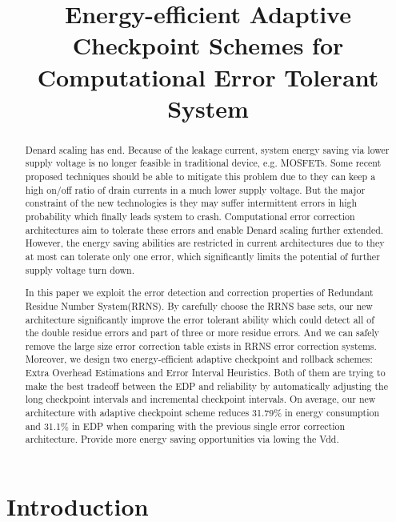 \documentclass{sig-alternate}
\title{Energy-efficient Adaptive Checkpoint Schemes for Computational Error Tolerant System}
\begin{document}
\sloppy
\maketitle
\thispagestyle{firstpage}
\pagestyle{plain}




\begin{abstract}

Denard scaling has end. Because of the leakage current, system energy saving via lower supply voltage is no longer feasible in traditional device, e.g. MOSFETs. Some recent proposed techniques should be able to mitigate this problem due to they can keep a high on/off ratio of drain currents in a much lower supply voltage. But the major constraint of the new technologies is they may suffer intermittent errors in high probability which finally leads system to crash. Computational error correction architectures aim to tolerate these errors and enable Denard scaling further extended. However, the energy saving abilities are restricted in current architectures due to they at most can tolerate only one error, which significantly limits the potential of further supply voltage turn down. 

In this paper we exploit the error detection and correction properties of Redundant Residue Number System(RRNS). By carefully choose the RRNS base sets, our new architecture significantly improve the error tolerant ability which could detect all of the double residue errors and part of three or more residue errors. And we can safely remove the large size error correction table exists in RRNS error correction systems. Moreover, we design two energy-efficient adaptive checkpoint and rollback schemes: Extra Overhead Estimations and Error Interval Heuristics. Both of them are trying to make the best tradeoff between the EDP and reliability by automatically adjusting the long checkpoint intervals and incremental checkpoint intervals. On average, our new architecture with adaptive checkpoint scheme reduces 31.79\%  in energy consumption and 31.1\% in EDP when comparing with the previous single error correction architecture. Provide more energy saving opportunities via lowing the Vdd. 

\end{abstract}


\section{Introduction}
\end{document}
